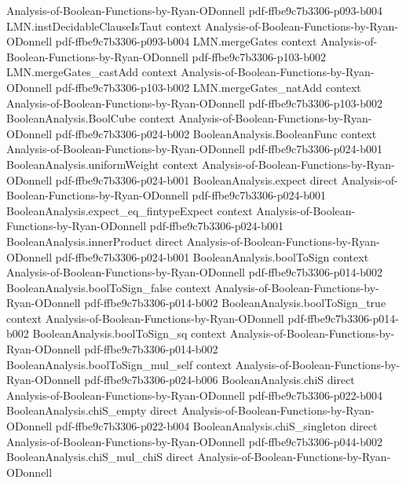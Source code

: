 \begin{lemma}
  {Analysis-of-Boolean-Functions-by-Ryan-ODonnell}
  {pdf-ffbe9c7b3306-p093-b004}
\proofstep
  {LMN.instDecidableClauseIsTaut}
  {context}
  {Analysis-of-Boolean-Functions-by-Ryan-ODonnell}
  {pdf-ffbe9c7b3306-p093-b004}
\proofstep
  {LMN.mergeGates}
  {context}
  {Analysis-of-Boolean-Functions-by-Ryan-ODonnell}
  {pdf-ffbe9c7b3306-p103-b002}
\proofstep
  {LMN.mergeGates_castAdd}
  {context}
  {Analysis-of-Boolean-Functions-by-Ryan-ODonnell}
  {pdf-ffbe9c7b3306-p103-b002}
\proofstep
  {LMN.mergeGates_natAdd}
  {context}
  {Analysis-of-Boolean-Functions-by-Ryan-ODonnell}
  {pdf-ffbe9c7b3306-p103-b002}
\proofstep
  {BooleanAnalysis.BoolCube}
  {context}
  {Analysis-of-Boolean-Functions-by-Ryan-ODonnell}
  {pdf-ffbe9c7b3306-p024-b002}
\proofstep
  {BooleanAnalysis.BooleanFunc}
  {context}
  {Analysis-of-Boolean-Functions-by-Ryan-ODonnell}
  {pdf-ffbe9c7b3306-p024-b001}
\proofstep
  {BooleanAnalysis.uniformWeight}
  {context}
  {Analysis-of-Boolean-Functions-by-Ryan-ODonnell}
  {pdf-ffbe9c7b3306-p024-b001}
\proofstep
  {BooleanAnalysis.expect}
  {direct}
  {Analysis-of-Boolean-Functions-by-Ryan-ODonnell}
  {pdf-ffbe9c7b3306-p024-b001}
\proofstep
  {BooleanAnalysis.expect_eq_fintypeExpect}
  {context}
  {Analysis-of-Boolean-Functions-by-Ryan-ODonnell}
  {pdf-ffbe9c7b3306-p024-b001}
\proofstep
  {BooleanAnalysis.innerProduct}
  {direct}
  {Analysis-of-Boolean-Functions-by-Ryan-ODonnell}
  {pdf-ffbe9c7b3306-p024-b001}
\proofstep
  {BooleanAnalysis.boolToSign}
  {context}
  {Analysis-of-Boolean-Functions-by-Ryan-ODonnell}
  {pdf-ffbe9c7b3306-p014-b002}
\proofstep
  {BooleanAnalysis.boolToSign_false}
  {context}
  {Analysis-of-Boolean-Functions-by-Ryan-ODonnell}
  {pdf-ffbe9c7b3306-p014-b002}
\proofstep
  {BooleanAnalysis.boolToSign_true}
  {context}
  {Analysis-of-Boolean-Functions-by-Ryan-ODonnell}
  {pdf-ffbe9c7b3306-p014-b002}
\proofstep
  {BooleanAnalysis.boolToSign_sq}
  {context}
  {Analysis-of-Boolean-Functions-by-Ryan-ODonnell}
  {pdf-ffbe9c7b3306-p014-b002}
\proofstep
  {BooleanAnalysis.boolToSign_mul_self}
  {context}
  {Analysis-of-Boolean-Functions-by-Ryan-ODonnell}
  {pdf-ffbe9c7b3306-p024-b006}
\proofstep
  {BooleanAnalysis.chiS}
  {direct}
  {Analysis-of-Boolean-Functions-by-Ryan-ODonnell}
  {pdf-ffbe9c7b3306-p022-b004}
\proofstep
  {BooleanAnalysis.chiS_empty}
  {direct}
  {Analysis-of-Boolean-Functions-by-Ryan-ODonnell}
  {pdf-ffbe9c7b3306-p022-b004}
\proofstep
  {BooleanAnalysis.chiS_singleton}
  {direct}
  {Analysis-of-Boolean-Functions-by-Ryan-ODonnell}
  {pdf-ffbe9c7b3306-p044-b002}
\proofstep
  {BooleanAnalysis.chiS_mul_chiS}
  {direct}
  {Analysis-of-Boolean-Functions-by-Ryan-ODonnell}

\end{lemma}
